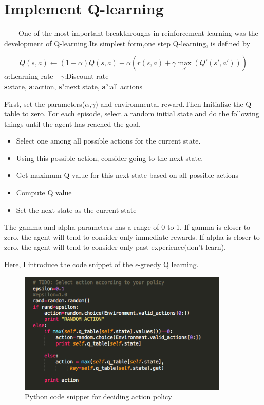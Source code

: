 \documentclass[a4paper,11pt]{article}
\begin{document}
\section{Implement Q-learning}
\ \ \ \ One of the most important breakthroughs in reinforcement learning was the development of Q-learning.Its simplest form,one step Q-learning, is defined by

\begin{equation}
	Q(s,a)\leftarrow (1-\alpha)Q(s,a)+\alpha(r(s,a)+\gamma \max_{a'}(Q'(s',a')))
\end{equation}
$\alpha$:Learning rate　$\gamma$:Discount rate \\
{\bf s}:state, {\bf a}:action, {\bf s'}:next state, {\bf a'}:all actions


First, set the parameters($\alpha$,$\gamma$) and environmental reward.Then Initialize the Q table to zero. For each episode, select a random initial state and do the following things until the agent has reached the goal.
\begin{itemize}
\item Select one among all possible actions for the current state.
\item Using this possible action, consider going to the next state.
\item Get maximum Q value for this next state based on all possible actions
\item Compute Q value
\item Set the next state as the current state
\end{itemize}


The gamma and alpha parameters has a range of 0 to 1. If gamma is closer to zero, the agent will tend to consider only immediate rewards. If alpha is closer to zero, the agent will tend to consider only past experience(don't learn).

Here, I introduce the code snippet of the $\epsilon$-greedy Q learning.
\begin{figure}[H]
\begin{center}
\includegraphics[width=100mm]{graph/python_code.jpg}
\end{center}
\caption{Python code snippet for deciding action policy}
\label{fig:1}
\end{figure}
\end{document}
